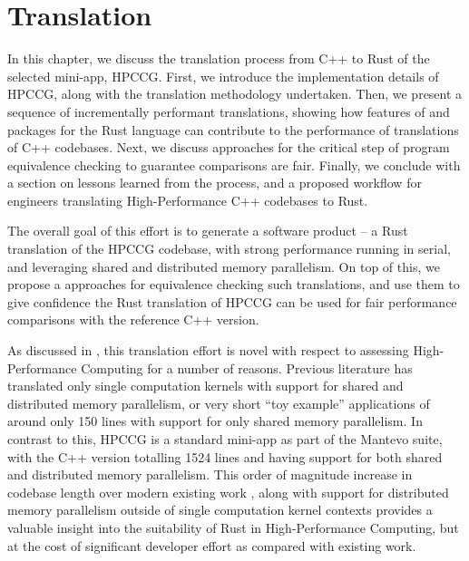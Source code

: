 \chapter{Translation}
\label{ch:translation} %


In this chapter, we discuss the translation process from C++ to Rust of the selected mini-app, HPCCG. First, we introduce the implementation details of HPCCG, along with the translation methodology undertaken. Then, we present a sequence of incrementally performant translations, showing how features of and packages for the Rust language can contribute to the performance of translations of C++ codebases. Next, we discuss approaches for the critical step of program equivalence checking to guarantee comparisons are fair. Finally, we conclude with a section on lessons learned from the process, and a proposed workflow for engineers translating High-Performance C++ codebases to Rust.

The overall goal of this effort is to generate a software product -- a Rust translation of the HPCCG codebase, with strong performance running in serial, and leveraging shared and distributed memory parallelism. On top of this, we propose a approaches for equivalence checking such translations, and use them to give confidence the Rust translation of HPCCG can be used for fair performance comparisons with the reference C++ version.

As discussed in , this translation effort is novel with respect to assessing High-Performance Computing for a number of reasons. Previous literature has translated only single computation kernels \cite{} with support for shared and distributed memory parallelism, or very short ``toy example'' applications of around only 150 lines \cite{} \cite{} with support for only shared memory parallelism. In contrast to this, HPCCG is a standard mini-app as part of the Mantevo suite, with the C++ version totalling 1524 lines and having support for both shared and distributed memory parallelism. This order of magnitude increase in codebase length over modern existing work \cite{}, along with support for distributed memory parallelism outside of single computation kernel contexts provides a valuable insight into the suitability of Rust in High-Performance Computing, but at the cost of significant developer effort as compared with existing work.

